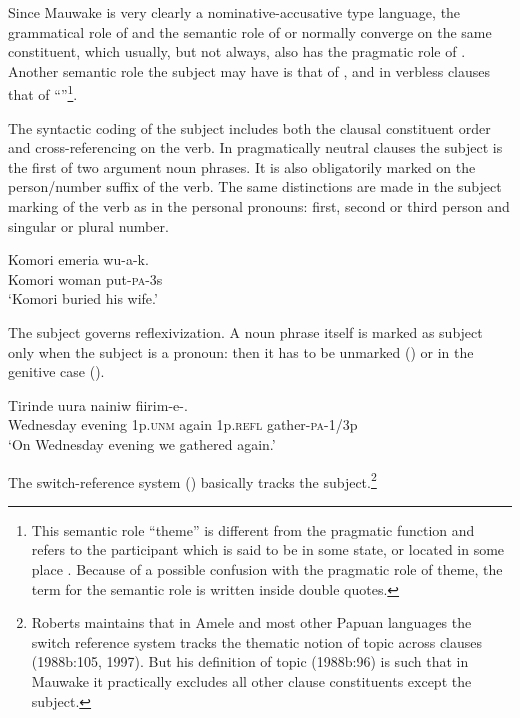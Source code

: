 Since Mauwake is very clearly a nominative-accusative type language, the grammatical role of \textstyleEmphasizedWords{\textsc{} }and the semantic role of \textstyleEmphasizedWords{\textsc{} }or\textstyleEmphasizedWords{\textsc{} } normally converge on the same constituent, which usually, but not always, also has the pragmatic role of . Another semantic role the subject may have is that of , and in verbless clauses that of ``''\footnote{This semantic role ``theme'' is different from the pragmatic function and refers to the participant which is said to be in some state, or located in some place \citep[140]{Andrews2007a}. Because of a possible confusion with the pragmatic role of theme, the term for the semantic role is written inside double quotes.}.

The syntactic coding of the subject includes both the clausal constituent order and cross-referencing on the verb.  In pragmatically neutral clauses the subject is the first of two argument noun phrases.  It is also obligatorily marked on the person/number suffix of the verb. The same distinctions are made in the subject marking of the verb as in the personal pronouns: first, second or third person and singular or plural number.

\ea%
\label{ex:x936}
\gll Komori  emeria  wu-a-k. \\
     Komori  woman  put-\textsc{pa}-3s \\
\glt `Komori buried his wife.'
\z

The subject governs reflexivization.  A noun phrase itself is marked as subject only when the subject  is a pronoun: then it has to be unmarked () or in the genitive case ().

\ea%
\label{ex:x920}
\gll Tirinde  uura    nainiw    fiirim-e-. \\
     Wednesday  evening  1p.\textsc{unm}  again  1p.\textsc{refl}  gather-\textsc{pa}-1/3p \\
\glt `On Wednesday evening we gathered again.'
\z

The switch-reference system () basically tracks the subject.\footnote{Roberts maintains that in Amele and most other Papuan languages the switch reference system tracks the thematic notion of topic across clauses (1988b:105, 1997). But his definition of topic (1988b:96) is such that in Mauwake it practically excludes all other clause constituents except the subject.} 

